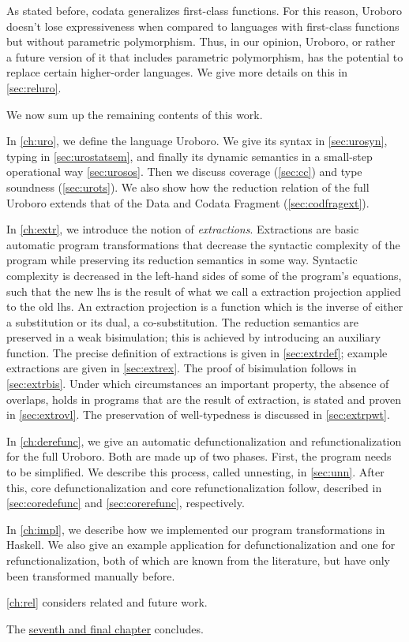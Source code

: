 As stated before, codata generalizes first-class functions. For this reason, Uroboro doesn't lose expressiveness when compared to languages with first-class functions but without parametric polymorphism. Thus, in our opinion, Uroboro, or rather a future version of it that includes parametric polymorphism, has the potential to replace certain higher-order languages. We give more details on this in \autoref{sec:reluro}.

We now sum up the remaining contents of this work.

In \autoref{ch:uro}, we define the language Uroboro. We give its syntax in \autoref{sec:urosyn}, typing in \autoref{sec:urostatsem}, and finally its dynamic semantics in a small-step operational way \autoref{sec:urosos}. Then we discuss coverage (\autoref{sec:cc}) and type soundness (\autoref{sec:urots}). We also show how the reduction relation of the full Uroboro extends that of the Data and Codata Fragment (\autoref{sec:codfragext}).

In \autoref{ch:extr}, we introduce the notion of \textit{extractions}. Extractions are basic automatic program transformations that decrease the syntactic complexity of the program while preserving its reduction semantics in some way. Syntactic complexity is decreased in the left-hand sides of some of the program's equations, such that the new lhs is the result of what we call a extraction projection applied to the old lhs. An extraction projection is a function which is the inverse of either a substitution or its dual, a co-substitution. The reduction semantics are preserved in a weak bisimulation; this is achieved by introducing an auxiliary function. The precise definition of extractions is given in \autoref{sec:extrdef}; example extractions are given in \autoref{sec:extrex}. The proof of bisimulation follows in \autoref{sec:extrbis}. Under which circumstances an important property, the absence of overlaps, holds in programs that are the result of extraction, is stated and proven in \autoref{sec:extrovl}. The preservation of well-typedness is discussed in \autoref{sec:extrpwt}.

In \autoref{ch:derefunc}, we give an automatic defunctionalization and refunctionalization for the full Uroboro. Both are made up of two phases. First, the program needs to be simplified. We describe this process, called unnesting, in \autoref{sec:unn}. After this, core defunctionalization and core refunctionalization follow, described in \autoref{sec:coredefunc} and \autoref{sec:corerefunc}, respectively.

In \autoref{ch:impl}, we describe how we implemented our program transformations in Haskell. We also give an example application for defunctionalization and one for refunctionalization, both of which are known from the literature, but have only been transformed manually before.

\autoref{ch:rel} considers related and future work.

The \hyperref[ch:concl]{seventh and final chapter} concludes.
